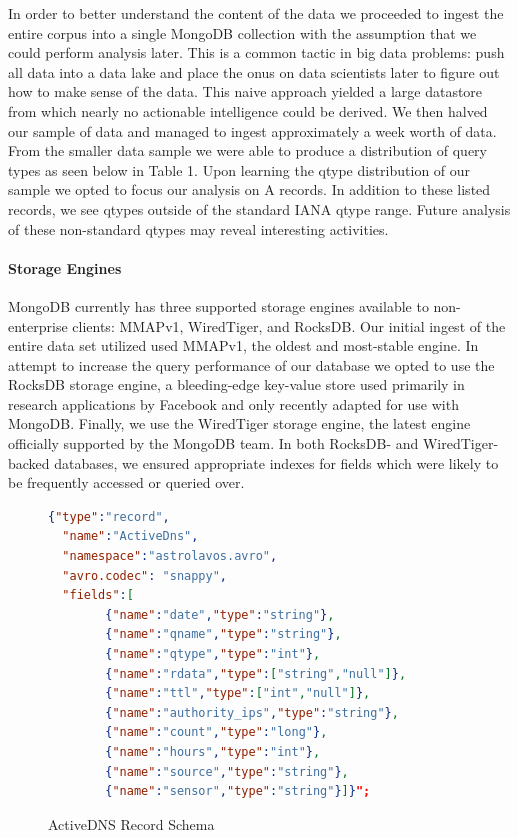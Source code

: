 \documentclass{acm_proc_article-sp}
\begin{document}
In order to better understand the content of the data we proceeded to ingest the entire corpus into a single MongoDB collection with the assumption that we could perform analysis later. This is a common tactic in big data problems: push all data into a data lake and place the onus on data scientists later to figure out how to make sense of the data. This naive approach yielded a large datastore from which nearly no actionable intelligence could be derived. We then halved our sample of data and managed to ingest approximately a week worth of data. From the smaller data sample we were able to produce a distribution of query types as seen below in Table 1. Upon learning the qtype distribution of our sample we opted to focus our analysis on A records. In addition to these listed records, we see qtypes outside of the standard IANA qtype range. Future analysis of these non-standard qtypes may reveal interesting activities.


\paragraph{Storage Engines}
MongoDB currently has three supported storage engines available to non-enterprise clients: MMAPv1, WiredTiger, and RocksDB. Our initial ingest of the entire data set utilized used MMAPv1, the oldest and most-stable engine. In attempt to increase the query performance of our database we opted to use the RocksDB storage engine, a bleeding-edge key-value store used primarily in research applications by Facebook and only recently adapted for use with MongoDB. Finally, we use the WiredTiger storage engine, the latest engine officially supported by the MongoDB team. In both RocksDB- and WiredTiger-backed databases, we ensured appropriate indexes for fields which were likely to be frequently accessed or queried over.

\begin{figure}
\begin{lstlisting}[language=json,firstnumber=1]
{"type":"record",
  "name":"ActiveDns",
  "namespace":"astrolavos.avro",
  "avro.codec": "snappy",
  "fields":[
        {"name":"date","type":"string"},
        {"name":"qname","type":"string"},
        {"name":"qtype","type":"int"},
        {"name":"rdata","type":["string","null"]},
        {"name":"ttl","type":["int","null"]},
        {"name":"authority_ips","type":"string"},
        {"name":"count","type":"long"},
        {"name":"hours","type":"int"},
        {"name":"source","type":"string"},
        {"name":"sensor","type":"string"}]}";
\end{lstlisting}
\caption{ActiveDNS Record Schema}\label{fig:avro_schema}
\end{figure}
\end{document}
